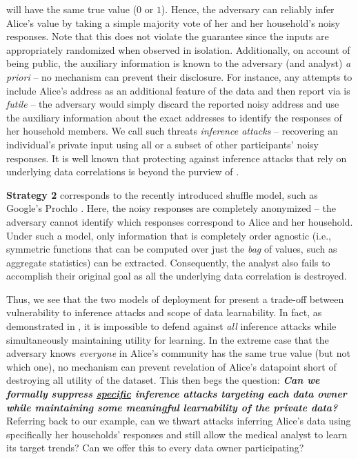   will have the same true value ($0$ or $1$). Hence, the adversary can reliably infer Alice's value by taking a simple majority vote of her and her household's noisy responses. Note that this does not violate the \ldp guarantee since the inputs are appropriately randomized when observed in isolation. Additionally, on account of being public, the auxiliary information is known to the adversary (and analyst) \emph{a priori} -- no mechanism can prevent their disclosure. For instance, any attempts to include Alice's address as an additional feature of the data and then report via \ldp is \emph{futile} --   the adversary would simply discard the reported noisy address and use the auxiliary information about the exact addresses to identify the responses of her household members. We call such threats \emph{inference attacks} -- recovering an individual's private input using all or a subset of other participants' noisy responses. It is well known that protecting against inference attacks that rely on underlying data correlations is beyond the purview of \DP  \citep{Pufferfish, sok}. 
  
\textbf{Strategy 2} corresponds to the recently introduced shuffle \DP model, such as Google's Prochlo \citep{Prochlo}.  Here, the noisy responses are completely anonymized -- the adversary cannot identify which \ldp responses correspond to Alice and her household.  Under such a model, only information that is completely order agnostic (i.e., symmetric functions that can be computed over just the \textit{bag} of values, such as aggregate statistics) can be extracted. Consequently, the analyst also fails to accomplish their original goal as all the underlying data correlation is destroyed.
 
Thus, we see that the two models of deployment for \ldp present a trade-off between vulnerability to inference attacks and scope of data learnability. In fact, as demonstrated in \cite{Kifer}, it is impossible to defend against \emph{all} inference attacks while simultaneously maintaining utility for learning. In the extreme case that the adversary knows \emph{everyone} in Alice's community has the same true value (but not which one), no mechanism can prevent revelation of Alice's datapoint short of destroying all utility of the dataset. This then begs the question: \textbf{\emph{Can we formally suppress \underline{specific} inference attacks targeting each data owner while maintaining some meaningful learnability of the private data?}} Referring back to our example, can we thwart attacks inferring Alice's data using specifically her households' responses and still allow the medical analyst to learn its target trends? Can we offer this to every data owner participating?
 
